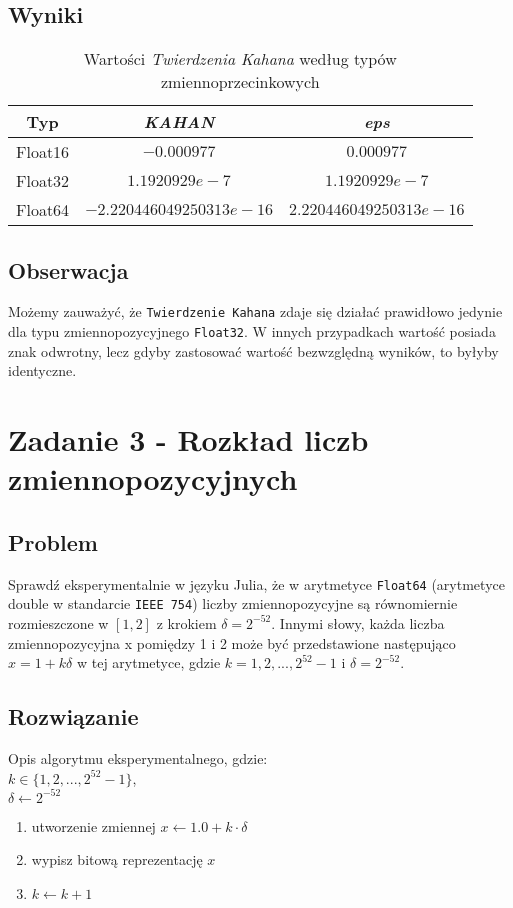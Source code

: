 \documentclass{article}
\begin{document}
    \subsection{Wyniki}
        {\small
        \begin{table}[h!]
        \centering
        \begin{tabular}{c c c}
            \hline
             Typ & \textit{KAHAN} & \textit{eps}\\
             \hline
             Float16 & $-0.000977$ & $0.000977$ \\
             Float32 & $1.1920929e-7$ & $1.1920929e-7$ \\
             Float64 & $-2.220446049250313e-16$ & $2.220446049250313e-16$\\
             \hline
        \end{tabular}
        \caption{Wartości \textit{Twierdzenia Kahana} według typów zmiennoprzecinkowych}
        \label{table:kahan}
        \end{table}
        }
    \subsection{Obserwacja}
        Możemy zauważyć, że \texttt{Twierdzenie Kahana} zdaje się działać prawidłowo jedynie dla typu zmiennopozycyjnego \texttt{Float32}. W innych przypadkach wartość posiada znak odwrotny, lecz gdyby zastosować wartość bezwzględną wyników, to byłyby identyczne.
        
    \section{Zadanie 3 - Rozkład liczb zmiennopozycyjnych}
        \subsection{Problem}
            Sprawdź eksperymentalnie w języku Julia, że w arytmetyce \texttt{Float64} (arytmetyce double w standarcie \texttt{IEEE 754}) liczby zmiennopozycyjne są równomiernie rozmieszczone w $[1, 2]$ z
            krokiem $\delta = 2^{-52}$. Innymi słowy, każda liczba zmiennopozycyjna x pomiędzy 1 i 2 może
            być przedstawione następująco $x = 1 + k\delta$ w tej arytmetyce, gdzie $k = 1, 2, . . . , 2^{52} - 1$ i
            $\delta = 2^{-52}$.
        \subsection{Rozwiązanie}
            Opis algorytmu eksperymentalnego, gdzie: \\
            $k \in \{1, 2, ... , 2^{52}-1\}$, \\
            $\delta \gets 2^{-52}$
            \begin{enumerate}
                \item utworzenie zmiennej $x \gets 1.0 + k\cdot\delta$
                \item wypisz bitową reprezentację $x$
                \item $k \gets k + 1$
            \end{enumerate}
\end{document}
